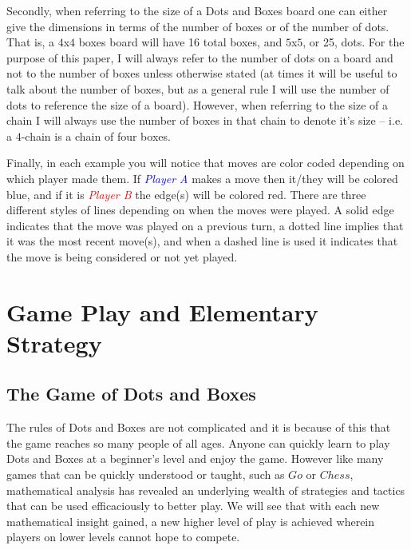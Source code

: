 \documentclass[12pt,twoside]{reedthesis}
\begin{document}
Secondly, when referring to the size of a Dots and Boxes board one can either give the dimensions in terms of the number of boxes or of the number of dots.  That is, a $4$x$4$ boxes board will have 16 total boxes, and $5$x$5$, or 25, dots.  For the purpose of this paper, I will always refer to the number of dots on a board and not to the number of boxes unless otherwise stated (at times it will be useful to talk about the number of boxes, but as a general rule I will use the number of dots to reference the size of a board).  However, when referring to the size of a chain I will always use the number of boxes in that chain to denote it's size -- i.e. a $4$-chain is a chain of four boxes.

Finally, in each example you will notice that moves are color coded depending on which player made them.  If \emph{\textcolor{blue}{Player A}} makes a move then it/they will be colored blue, and if it is \emph{\textcolor{red}{Player B}} the edge(s) will be colored red.  There are three different styles of lines depending on when the moves were played.  A solid edge indicates that the move was played on a previous turn, a dotted line implies that it was the most recent move(s), and when a dashed line is used it indicates that the move is being considered or not yet played.



\chapter{Game Play and Elementary Strategy}

\section{The Game of Dots and Boxes}
The rules of Dots and Boxes are not complicated and it is because of this that the game reaches so many people of all ages. Anyone can quickly learn to play Dots and Boxes at a beginner's level and enjoy the game.  However like many games that can be quickly understood or taught, such as $Go$ or $Chess$, mathematical analysis has revealed an underlying wealth of strategies and tactics that can be used efficaciously to better play.  We will see that with each new mathematical insight gained, a new higher level of play is achieved wherein players on lower levels cannot hope to compete.
\end{document}
